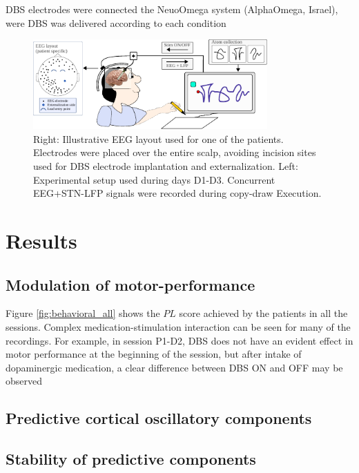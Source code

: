 \documentclass[10pt,a4paper]{article}
\begin{document}
DBS electrodes were connected the NeuoOmega system (AlphaOmega, Israel), were DBS was delivered according to each condition

\begin{figure}[h!]
\centering
\includegraphics[width=0.8\textwidth]{figures/paradigm_layout}
\caption{Right: Illustrative EEG layout used for one of the patients. Electrodes were placed over the entire scalp, avoiding incision sites used for DBS electrode implantation and externalization. Left: Experimental setup used during days D1-D3. Concurrent EEG+STN-LFP signals were recorded during copy-draw Execution.}
\label{fig:paradigm_layout}
\end{figure}


\section{Results}
\subsection{Modulation of motor-performance}
Figure \ref{fig:behavioral_all} shows the $PL$ score achieved by the patients in all the sessions. Complex medication-stimulation interaction can be seen for many of the recordings. For example, in session P1-D2, DBS does not have an evident effect in motor performance at the beginning of the session, but after intake of dopaminergic medication, a clear difference between DBS ON and OFF may be observed
%




\subsection{Predictive cortical oscillatory components}
%
%
\subsection{Stability of predictive components}
%
\end{document}
